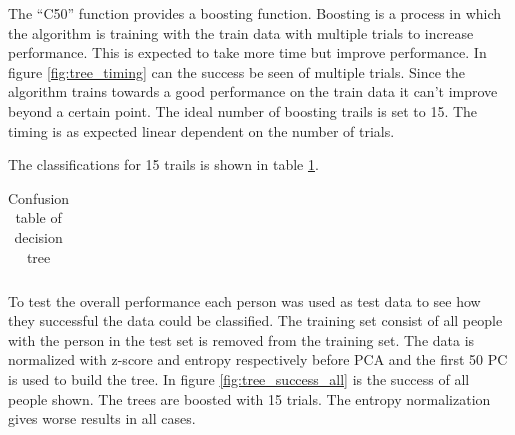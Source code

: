 The ``C50'' function provides a boosting function.
Boosting is a process in which the algorithm is training with the train data with multiple trials to increase performance.
This is expected to take more time but improve performance.
In figure \ref{fig:tree_timing} can the success be seen of multiple trials.
Since the algorithm trains towards a good performance on the train data it can't improve beyond a certain point.
The ideal number of boosting trails is set to 15.
The timing is as expected linear dependent on the number of trials.

The classifications for 15 trails is shown in table \ref{tb:tree_confus}. 

\begin{table}[H]
    \centering
    \begin{subtable}{0.005\textwidth}
    \end{subtable}
    \begin{subtable}{0.8\textwidth}
        \centering
    \end{subtable}

    \begin{subtable}{0.005\textwidth}
        \flushright
    \end{subtable}
    \begin{subtable}{0.8\textwidth}
        \begin{subtable}{\textwidth}
            \centering
            \begin{tabular}{*{11}{c}}
                
            \end{tabular}
        \end{subtable}
    \end{subtable}
    \caption{Confusion table of decision tree}
    \label{tb:tree_confus}
\end{table}

To test the overall performance each person was used as test data to see how they successful the data could be classified.
The training set consist of all people with the person in the test set is removed from the training set. 
The data is normalized with z-score and entropy respectively before PCA and the first 50 PC is used to build the tree. 
In figure \ref{fig:tree_success_all} is the success of all people shown.
The trees are boosted with 15 trials.
The entropy normalization gives worse results in all cases.

